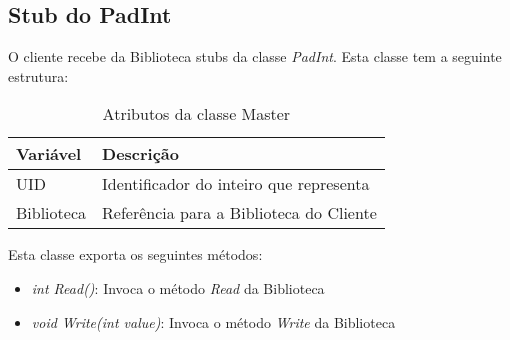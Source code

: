 \subsection{Stub do PadInt}

O cliente recebe da Biblioteca stubs da classe \textit{PadInt}. Esta classe tem a seguinte estrutura:

\begin{table}[H]
\centering
\begin{tabular}{| p{2cm} | p{} |}
\hline
\textbf{Variável} & \textbf{Descrição} \\
\hline
UID & Identificador do inteiro que representa \\
\hline
Biblioteca & Referência para a Biblioteca do Cliente \\
\hline
\end{tabular}
\caption{Atributos da classe Master}
\end{table}

Esta classe exporta os seguintes métodos:

\begin{itemize}
	\item \textit{int Read()}: Invoca o método \textit{Read} da Biblioteca
	\item \textit{void Write(int value)}: Invoca o método \textit{Write} da Biblioteca
\end{itemize}